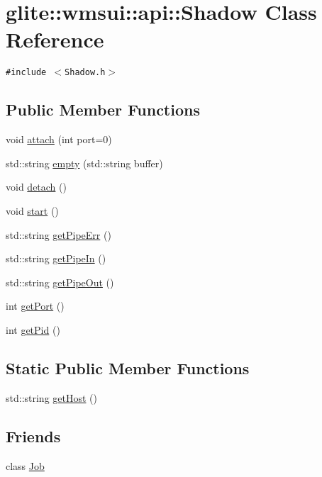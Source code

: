 \hypertarget{classglite_1_1wmsui_1_1api_1_1Shadow}{
\section{glite::wmsui::api::Shadow Class Reference}
\label{classglite_1_1wmsui_1_1api_1_1Shadow}
}
{\tt \#include $<$Shadow.h$>$}

\subsection*{Public Member Functions}
\begin{CompactItemize}
\item 
void \hyperlink{classglite_1_1wmsui_1_1api_1_1Shadow_a0}{attach} (int port=0)
\item 
std::string \hyperlink{classglite_1_1wmsui_1_1api_1_1Shadow_a1}{empty} (std::string buffer)
\item 
void \hyperlink{classglite_1_1wmsui_1_1api_1_1Shadow_a2}{detach} ()
\item 
void \hyperlink{classglite_1_1wmsui_1_1api_1_1Shadow_a3}{start} ()
\item 
std::string \hyperlink{classglite_1_1wmsui_1_1api_1_1Shadow_a4}{get\-Pipe\-Err} ()
\item 
std::string \hyperlink{classglite_1_1wmsui_1_1api_1_1Shadow_a5}{get\-Pipe\-In} ()
\item 
std::string \hyperlink{classglite_1_1wmsui_1_1api_1_1Shadow_a6}{get\-Pipe\-Out} ()
\item 
int \hyperlink{classglite_1_1wmsui_1_1api_1_1Shadow_a7}{get\-Port} ()
\item 
int \hyperlink{classglite_1_1wmsui_1_1api_1_1Shadow_a8}{get\-Pid} ()
\end{CompactItemize}
\subsection*{Static Public Member Functions}
\begin{CompactItemize}
\item 
std::string \hyperlink{classglite_1_1wmsui_1_1api_1_1Shadow_e0}{get\-Host} ()
\end{CompactItemize}
\subsection*{Friends}
\begin{CompactItemize}
\item 
class \hyperlink{classglite_1_1wmsui_1_1api_1_1Shadow_n0}{Job}
\end{CompactItemize}


